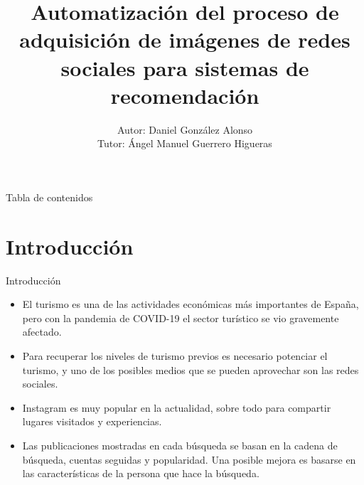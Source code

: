 \documentclass[aspectratio=149]{beamer}
\title[Automatización del proceso de adquisición de imágenes de redes sociales para sistemas de recomendación]{Automatización del proceso de adquisición de imágenes de redes sociales para sistemas de recomendación}
\author[Daniel González Alonso]{
    Autor: Daniel González Alonso\\[1ex] 
    Tutor: Ángel Manuel Guerrero Higueras}
\institute[Universidad de Valladolid]{
    Máster Universitario en Inteligencia de Negocio \\[-4pt]
    y Big Data en Entornos Seguros}
\begin{document}
\begin{frame}[label=title, plain]
    \titlepage
\end{frame}

\begin{frame}[label=toc]{Tabla de contenidos}
 \setlength{\leftskip}{5cm}%
 \tableofcontents[subsectionstyle=hide]
\end{frame}

\section{Introducción}
\begin{frame}[label=intro]{Introducción}
    \begin{itemize}
        \item El turismo es una de las actividades económicas más importantes de España, pero con la pandemia de COVID-19 el sector turístico se vio gravemente afectado.
        \item Para recuperar los niveles de turismo previos es necesario potenciar el turismo, y uno de los posibles medios que se pueden aprovechar son las redes sociales.
        \item Instagram es muy popular en la actualidad, sobre todo para compartir lugares visitados y experiencias.
        \item Las publicaciones mostradas en cada búsqueda se basan en la cadena de búsqueda, cuentas seguidas y popularidad. Una posible mejora es basarse en las características de la persona que hace la búsqueda.
    \end{itemize}
\end{frame}

\end{document}
